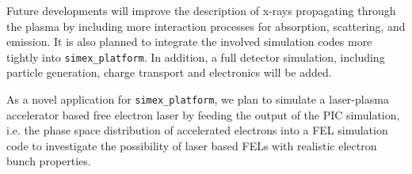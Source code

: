 \documentclass[12pt]{scrartcl}
\begin{document}
Future developments will improve the description of x-rays propagating through
the plasma by including more interaction processes for absorption, scattering,
and emission. It is also planned to integrate the involved simulation codes more
tightly into \texttt{simex\_platform}. In addition, a full detector simulation,
including particle generation, charge transport and electronics will be added.

As a novel application for \texttt{simex\_platform}, we plan to simulate a
laser-plasma accelerator based free electron laser by feeding the output of the
PIC simulation, i.e. the phase space distribution of accelerated electrons into
a FEL simulation code to investigate the possibility of laser based FELs with
realistic electron bunch properties.

\printbibliography[]
\end{document}
